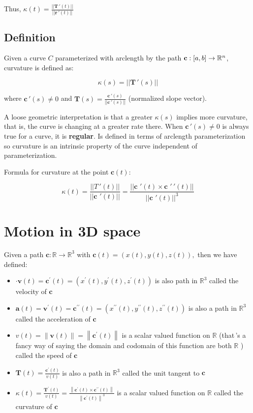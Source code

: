 Thus, $\boxed{\kappa(t)=\frac{||\textbf{T}\,'(t)||}{||\textbf{r}\,'(t)||}}$

\subsection{Definition}

Given a curve $C$ parameterized with arclength by the path $\textbf{c}:[a,b]\rightarrow \mathbb{R}^n$,
curvature is defined as:

\[\boxed{\kappa(s)=||\textbf{T}\,'(s)||}\]

where $\textbf{c}\,'(s)\neq 0$ and $\textbf{T}(s)=\frac{\textbf{c}\,'(s)}{||\textbf{c}\,'(s)||}$ (normalized slope vector).\newline

A loose geometric interpretation is that a greater $\kappa(s)$ implies
more curvature, that is, the curve is changing at a greater rate there.
When $\textbf{c}\,'(s)\neq 0$ is always true for a curve, it is \textbf{regular}.
Is defined in terms of arclength parameterization so curvature
is an intrinsic property of the curve independent of parameterization.\newline

\noindent
Formula for curvature at the point $\textbf{c}(t)$:

\[\boxed{\kappa(t)=\frac{||T\,'(t)||}{||\textbf{c}\,\,'(t)||}=\frac{||\textbf{c}\,\,'(t)\times \textbf{c}\,\,'\,'(t)||}{||\textbf{c}\,\,'(t)||^3}}\]

\section{Motion in 3D space}

Given a path $\textbf{c}: \mathbb{R} \rightarrow \mathbb{R}^{3}$ with $\textbf{c}(t)=(x(t), y(t), z(t)),$ then we have defined:
\begin{itemize}
    \item $\cdot \textbf{v}(t)=\textbf{c}^{\prime}(t)=\left(x^{\prime}(t), y^{\prime}(t), z^{\prime}(t)\right)$ is also path in $\mathbb{R}^{3}$ called the velocity of $\textbf{c}$
    \item $\textbf{a}(t)=\textbf{v}^{\prime}(t)=\textbf{c}^{\prime \prime}(t)=\left(x^{\prime \prime}(t), y^{\prime \prime}(t), z^{\prime \prime}(t)\right)$ is also a path in $\mathbb{R}^{3}$ called the acceleration of $\textbf{c}$
    \item $v(t)=\|\textbf{v}(t)\|=\left\|\textbf{c}^{\prime}(t)\right\|$ is a scalar valued function on $\mathbb{R}$ (that\,'s a fancy way of saying the domain and codomain of this function are both $\mathbb{R}$ ) called the speed of $\textbf{c}$
    \item $\textbf{T}(t)=\frac{\textbf{c}^{\prime}(t)}{v(t)}$ is also a path in $\mathbb{R}^{3}$ called the unit tangent to $\textbf{c}$
    \item $\kappa(t)=\frac{\textbf{T}^{\prime}(t)}{v(t)}=\frac{\left\|\textbf{c}^{\prime}(t) \times \textbf{c}^{\prime \prime}(t)\right\|}{\left\|\textbf{c}^{\prime}(t)\right\|^{3}}$ is a scalar valued function on $\mathbb{R}$ called the curvature of $\textbf{c}$
\end{itemize}

